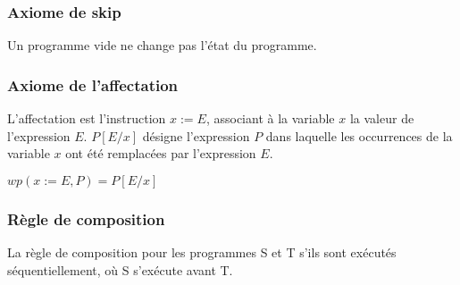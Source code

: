 \documentclass[9pt]{book}
\begin{document}
		\subsubsection{Axiome de skip}




\par
Un programme vide ne change pas l'\'etat du programme.
		\subsubsection{Axiome de l'affectation}
		L'affectation est l'instruction $x := E$, associant \`a la variable $x$ la valeur de l'expression $E$. $P[ E/x]$ d\'esigne l'expression $P$ dans laquelle les occurrences de la variable $x$ ont \'et\'e remplac\'ees par l'expression $E$.


\par
 $wp(x := E, P) = P[E/x]$
\subsubsection{R\`egle de composition}

La r\`egle de composition pour les programmes S et T s'ils sont ex\'ecut\'es s\'equentiellement, o\`u S s'ex\'ecute avant T.

\end{document}
